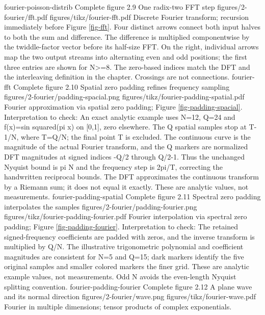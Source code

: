 {fourier-poisson-distrib}
{Complete figure}
{2.9}
{One radix-two FFT step}
{figures/2-fourier/fft.pdf}
{figures/tikz/fourier-fft.pdf}
{Discrete Fourier transform; recursion immediately before Figure \ref{fig-fft}.}
{Four distinct arrows connect both input halves to both the sum and difference. The difference is multiplied componentwise by the twiddle-factor vector before its half-size FFT. On the right, individual arrows map the two output streams into alternating even and odd positions; the first three entries are shown for N>=8. The zero-based indices match the DFT and the interleaving definition in the chapter. Crossings are not connections.}
{fourier-fft}
{Complete figure}
{2.10}
{Spatial zero padding refines frequency sampling}
{figures/2-fourier/padding-spacial.png}
{figures/tikz/fourier-padding-spatial.pdf}
{Fourier approximation via spatial zero padding; Figure \ref{fig-padding-spacial}.}
{Interpretation to check: An exact analytic example uses N=12, Q=24 and f(x)=sin squared(pi x) on [0,1], zero elsewhere. The Q spatial samples stop at T-1/N, where T=Q/N; the final point T is excluded. The continuous curve is the magnitude of the actual Fourier transform, and the Q markers are normalized DFT magnitudes at signed indices -Q/2 through Q/2-1. Thus the unchanged Nyquist bound is pi N and the frequency step is 2pi/T, correcting the handwritten reciprocal bounds. The DFT approximates the continuous transform by a Riemann sum; it does not equal it exactly. These are analytic values, not measurements.}
{fourier-padding-spatial}
{Complete figure}
{2.11}
{Spectral zero padding interpolates the samples}
{figures/2-fourier/padding-fourier.png}
{figures/tikz/fourier-padding-fourier.pdf}
{Fourier interpolation via spectral zero padding; Figure \ref{fig-padding-fourier}.}
{Interpretation to check: The retained signed-frequency coefficients are padded with zeros, and the inverse transform is multiplied by Q/N. The illustrative trigonometric polynomial and coefficient magnitudes are consistent for N=5 and Q=15; dark markers identify the five original samples and smaller colored markers the finer grid. These are analytic example values, not measurements. Odd N avoids the even-length Nyquist splitting convention.}
{fourier-padding-fourier}
{Complete figure}
{2.12}
{A plane wave and its normal direction}
{figures/2-fourier/wave.png}
{figures/tikz/fourier-wave.pdf}
{Fourier in multiple dimensions; tensor products of complex exponentials.}
